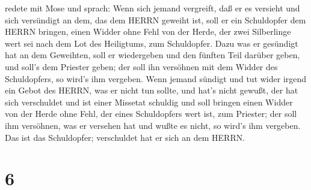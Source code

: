 redete mit Mose und sprach:  Wenn sich jemand vergreift,
daß er es versieht und sich versündigt an dem, das dem HERRN geweiht
ist, soll er ein Schuldopfer dem HERRN bringen, einen Widder ohne Fehl
von der Herde, der zwei Silberlinge wert sei nach dem Lot des
Heiligtums, zum Schuldopfer.  Dazu was er gesündigt hat an
dem Geweihten, soll er wiedergeben und den fünften Teil darüber geben,
und soll's dem Priester geben; der soll ihn versöhnen mit dem Widder des
Schuldopfers, so wird's ihm vergeben.  Wenn jemand sündigt
und tut wider irgend ein Gebot des HERRN, was er nicht tun sollte, und
hat's nicht gewußt, der hat sich verschuldet und ist einer Missetat
schuldig  und soll bringen einen Widder von der Herde ohne
Fehl, der eines Schuldopfers wert ist, zum Priester; der soll ihm
versöhnen, was er versehen hat und wußte es nicht, so wird's ihm
vergeben.  Das ist das Schuldopfer; verschuldet hat er sich
an dem HERRN.

\hypertarget{section-5}{%
\section{6}\label{section-5}}

